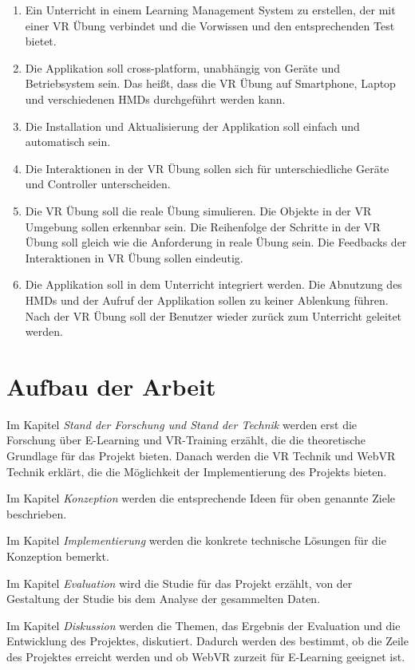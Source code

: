 \begin{enumerate}[labelsep=1ex]
	\renewcommand{\labelenumi}{\textbf{Z\theenumi.}}
	\item Ein Unterricht in einem Learning Management System zu erstellen, der mit einer VR Übung verbindet und die Vorwissen und den entsprechenden Test bietet.
	
	\item Die Applikation soll cross-platform, unabhängig von Geräte und Betriebsystem sein. Das heißt, dass die VR Übung auf Smartphone, Laptop und verschiedenen HMDs durchgeführt werden kann.
	
	\item Die Installation und Aktualisierung der Applikation soll einfach und automatisch sein.
	
	\item Die Interaktionen in der VR Übung sollen sich für unterschiedliche Geräte und Controller unterscheiden.
	
	\item Die VR Übung soll die reale Übung simulieren. Die Objekte in der VR Umgebung sollen erkennbar sein. Die Reihenfolge der Schritte in der VR Übung soll gleich wie die Anforderung in reale Übung sein. Die Feedbacks der Interaktionen in VR Übung sollen eindeutig.
	
	\item Die Applikation soll in dem Unterricht integriert werden. Die Abnutzung des HMDs und der Aufruf der Applikation sollen zu keiner Ablenkung führen. Nach der VR Übung soll der Benutzer wieder zurück zum Unterricht geleitet werden.
	
\end{enumerate}

\section{Aufbau der Arbeit}
Im Kapitel {\em Stand der Forschung und Stand der Technik} werden erst die Forschung über E-Learning und VR-Training erzählt, die die theoretische Grundlage für das Projekt bieten. Danach werden die VR Technik und WebVR Technik erklärt, die die Möglichkeit der Implementierung des Projekts bieten.

Im Kapitel {\em Konzeption} werden die entsprechende Ideen für oben genannte Ziele beschrieben. 

Im Kapitel {\em Implementierung} werden die konkrete technische Lösungen für die Konzeption bemerkt.

Im Kapitel {\em Evaluation} wird die Studie für das Projekt erzählt, von der Gestaltung der Studie bis dem Analyse der gesammelten Daten.

Im Kapitel {\em Diskussion} werden die Themen, das Ergebnis der Evaluation und die Entwicklung des Projektes, diskutiert. Dadurch werden des bestimmt, ob die Zeile des Projektes erreicht werden und ob WebVR zurzeit für E-Learning geeignet ist.